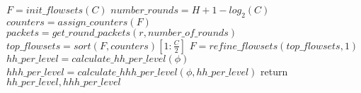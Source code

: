 \begin{algorithm}\small
    $F = init\_flowsets(C)$\;
    $number\_rounds=H+1-log_2(C)$\;
    {
        $counters=assign\_counters(F)$\;
        $packets=get\_round\_packets(r, number\_of\_rounds)$\;
        {
            $top\_flowsets=sort(F, counters)[1:\frac{C}{2}]$\;
            $F=refine\_flowsets(top\_flowsets,1)$\;
        }
    }
    $hh\_per\_level=calculate\_hh\_per\_level(\phi)$\;
    $hhh\_per\_level=calculate\_hhh\_per\_level(\phi, hh\_per\_level)$\;
    return $hh\_per\_level, hhh\_per\_level$
    \SetAlgoRefName{\simpleAlgo}
    \caption{}
    \label{algo:simple_split}
\end{algorithm}